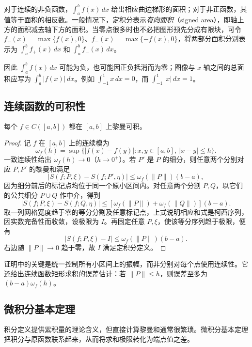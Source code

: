 对于连续的非负函数，$\int_a^b f(x)\,dx$ 给出相应曲边梯形的面积；对于非正函数，其值等于面积的相反数。一般情况下，定积分表示\emph{有向面积}（signed area），即轴上方的面积减去轴下方的面积。当零点很多时也不必把图形预先分成有限块，可令 $f_+(x)=\max\{f(x),0\}$、$f_-(x)=\max\{-f(x),0\}$，将两部分面积分别表示为 $\int_a^b f_+(x)\,dx$ 和 $\int_a^b f_-(x)\,dx$。

因此 $\int_a^b f(x)\,dx$ 可能为负，也可能因正负抵消而为零；图像与 $x$ 轴之间的总面积应写为 $\int_a^b|f(x)|\,dx$。例如 $\int_{-1}^1x\,dx=0$，而 $\int_{-1}^1|x|\,dx=1$。

\subsection{连续函数的可积性}
\label{subsec:integrability-of-continuous-functions}

\begin{theorem}
\label{thm:continuous-functions-riemann-integrable}
每个 $f\in C([a,b])$ 都在 $[a,b]$ 上黎曼可积。
\end{theorem}
\begin{proof}
记 $f$ 在 $[a,b]$ 上的连续模为
\[
    \omega_f(h)=\sup\{|f(x)-f(y)|:x,y\in[a,b],\ |x-y|\leq h\}.
\]
一致连续性给出 $\omega_f(h)\to0$（$h\to0^+$）。若 $P'$ 是 $P$ 的细分，则任意两个分别对应 $P,P'$ 的黎曼和满足
\[
    |S(f;P,\xi)-S(f;P',\eta)|
    \leq\omega_f(\|P\|)(b-a),
\]
因为细分前后的标记点均位于同一个原小区间内。对任意两个分割 $P,Q$，以它们的公共细分 $P\cup Q$ 作中介，得到
\[
    |S(f;P,\xi)-S(f;Q,\eta)|
    \leq[\omega_f(\|P\|)+\omega_f(\|Q\|)](b-a).
\]
取一列网格宽度趋于零的等分分割及任意标记点，上式说明相应和式是柯西序列，因实数完备性而收敛，设极限为 $I$。再固定任意 $P,\xi$，使该等分序列趋于极限，便有
\[
    |S(f;P,\xi)-I|\leq\omega_f(\|P\|)(b-a).
\]
右边随 $\|P\|\to0$ 趋于零，故 $I$ 满足定积分定义。
\end{proof}

证明中的关键是统一控制所有小区间上的振幅，而非分别对每个点使用连续性。它还给出连续函数矩形求积的误差估计：若 $\|P\|\leq h$，则误差至多为 $(b-a)\omega_f(h)$。

\subsection{微积分基本定理}
\label{subsec:fundamental-theorem-of-calculus}

积分定义提供累积量的理论含义，但直接计算黎曼和通常很繁琐。微积分基本定理把积分与原函数联系起来，从而将求和极限转化为端点值之差。

